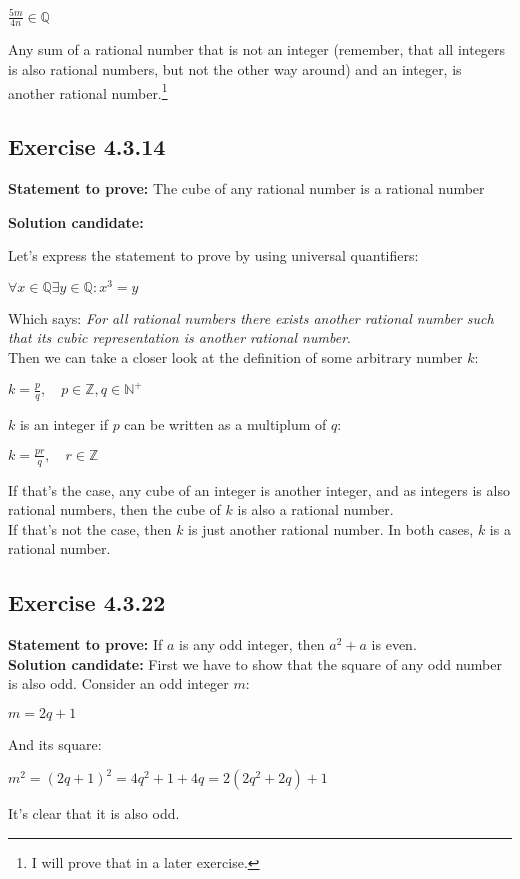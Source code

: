 \documentclass{report}
\newcommand{\cent}[1]{\begin{center}#1\end{center}}
\newcommand{\doubleZ}{\mathbb{Z}}
\newcommand{\doubleN}{\mathbb{N}}
\newcommand{\doubleQ}{\mathbb{Q}}
\newcommand{\In}{\! \in \!}
\newcommand{\Prove}{\textbf{Statement to prove: }}
\newcommand{\Solution}{\textbf{Solution candidate: }}
\newcommand{\QED}{\boxed{}}
\newcommand{\Exercise}[1]{\subsection{Exercise #1}}
\begin{document}
	\cent{$\frac{5m}{4n} \in \doubleQ$} 
	
	Any sum of a rational number that is not an integer (remember, that all integers is also rational numbers, but not the other way around) and an integer, is another rational number.\footnote{I will prove that in a later exercise.}\\
	\QED
	
	\Exercise{4.3.14}
	
	\Prove
	The cube of any rational number is a rational number
	
	\Solution
	
	Let's express the statement to prove by using universal quantifiers:
	
	\cent{$\forall x \In \doubleQ \exists y \In \doubleQ : x^3 = y$}
	
	Which says: \textit{For all rational numbers there exists another rational number such that its cubic representation is another rational number}.\\
	
	Then we can take a closer look at the definition of some arbitrary number $k$:
	
	\cent{$k = \frac{p}{q}, \quad p \In \doubleZ, q \In \doubleN^+$}
	
	$k$ is an integer if $p$ can be written as a multiplum of $q$:
	
	\cent{$k = \frac{pr}{q}, \quad r \In \doubleZ$}
	
	If that's the case, any cube of an integer is another integer, and as integers is also rational numbers, then the cube of $k$ is also a rational number.\\
	
	If that's not the case, then $k$ is just another rational number. In both cases, $k$ is a rational number.\\
	\QED
	
	\Exercise{4.3.22}
	
	\Prove
	If $a$ is any odd integer, then $a^2 + a$ is even.\\
	
	\Solution
	First we have to show that the square of any odd number is also odd. Consider an odd integer $m$:
	
	\cent{$m = 2q + 1$}
	
	And its square:
	
	\cent{$m^2 = (2q+1)^2 = 4q^2+1+4q = 2(2q^2 + 2q) + 1$}
	
	It's clear that it is also odd.\\
	
\end{document}
